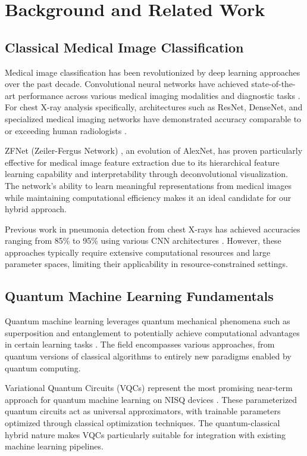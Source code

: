 \documentclass[conference]{IEEEtran}
\begin{document}
\section{Background and Related Work}
\label{sec:background}

\subsection{Classical Medical Image Classification}

Medical image classification has been revolutionized by deep learning approaches over the past decade. Convolutional neural networks have achieved state-of-the-art performance across various medical imaging modalities and diagnostic tasks \cite{litjens2017survey}. For chest X-ray analysis specifically, architectures such as ResNet, DenseNet, and specialized medical imaging networks have demonstrated accuracy comparable to or exceeding human radiologists \cite{rajpurkar2017chexnet}.

ZFNet (Zeiler-Fergus Network) \cite{zeiler2014visualizing}, an evolution of AlexNet, has proven particularly effective for medical image feature extraction due to its hierarchical feature learning capability and interpretability through deconvolutional visualization. The network's ability to learn meaningful representations from medical images while maintaining computational efficiency makes it an ideal candidate for our hybrid approach.

Previous work in pneumonia detection from chest X-rays has achieved accuracies ranging from 85\% to 95\% using various CNN architectures \cite{kermany2018identifying}. However, these approaches typically require extensive computational resources and large parameter spaces, limiting their applicability in resource-constrained settings.

\subsection{Quantum Machine Learning Fundamentals}

Quantum machine learning leverages quantum mechanical phenomena such as superposition and entanglement to potentially achieve computational advantages in certain learning tasks \cite{biamonte2017quantum}. The field encompasses various approaches, from quantum versions of classical algorithms to entirely new paradigms enabled by quantum computing.

Variational Quantum Circuits (VQCs) represent the most promising near-term approach for quantum machine learning on NISQ devices \cite{cerezo2021variational}. These parameterized quantum circuits act as universal approximators, with trainable parameters optimized through classical optimization techniques. The quantum-classical hybrid nature makes VQCs particularly suitable for integration with existing machine learning pipelines.
\end{document}
